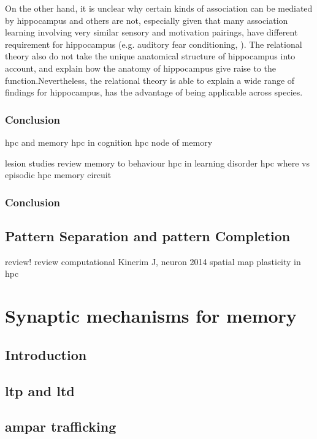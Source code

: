 On the other hand, it is unclear why certain kinds of association can be mediated by hippocampus and others are not, especially given that many association learning involving very similar sensory and motivation pairings, have different requirement for hippocampus (e.g. auditory fear conditioning, \citep{phillips92}). The relational theory also do not take the unique anatomical structure of hippocampus into account, and explain how the anatomy of hippocampus give raise to the function.Nevertheless, the relational theory is able to explain a wide range of findings for hippocampus, has the advantage of being applicable across species.

\subsubsection{Conclusion}
\citep{opitz14} hpc and memory
\citep{shohamy13} hpc in cognition
\citep{huijgen15} hpc node of memory

\citep{lee16} lesion studies review
\citep{mcdonald13} memory to behaviour
\citep{middei14} hpc in learning disorder
\citep{eichenbaum14} hpc where vs episodic
\citep{sasaki15} hpc memory circuit
\subsubsection{Conclusion}

\subsection{Pattern Separation and pattern Completion \label{pattern}}
\citep{knierim16} review!
\citep{rolls13} review
\citep{kesner15} computational
    Kinerim J, neuron 2014
    \citep{mehta15} spatial map plasticity in hpc

\section{Synaptic mechanisms for memory}
\subsection{Introduction}
\subsection{\gls{ltp} and \gls{ltd}}
\subsection{\gls{ampar} trafficking}
\citep{migues16}
